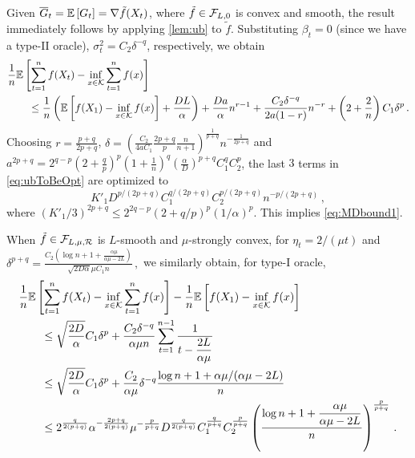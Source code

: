 Given $\overline{G}_t=\mathbb{E}\left[G_t\right] = \nabla \tilde{f}(X_t)$, where $\tilde{f}\in \mathcal{F}_{L,0}$ is convex and smooth,
the result immediately follows by applying \cref{lem:ub} to $\tilde{f}$.
Substituting
 $\beta_t = 0$ (since we have a type-II oracle), $\sigma^2_t = C_2 \delta^{-q}$, respectively, we obtain
 \begin{align}
\MoveEqLeft
\frac{1}{n} \EE{ \sum_{t=1}^n f( X_t) - \inf_{x \in \cK} \sum_{t=1}^n f(x)} \nonumber \\
&\le \frac{1}{n}\left(\EE{f(X_1)-\inf_{x \in \cK}f(x)}+\frac{DL}{\alpha}  \right) %
+\frac{Da}{\alpha} n^{r-1}+\dfrac{C_2 \delta^{-q}}{2a(1-r)}n^{-r}+ \left(2+\dfrac{2}{n}\right)C_1\delta^p \,.
\label{eq:ubToBeOpt}
 \end{align}
 Choosing $r = \frac{p+q}{2p+q}$,  
 $\delta = \left( \tfrac{C_2}{4aC_1}\tfrac{2p+q}{p}\tfrac{n}{n+1}\right)^{\frac{1}{p+q}}n^{-\frac{1}{2p+q}}$  and
 $a^{2p+q} =2^{q-p}\left( 2+\tfrac{q}{p} \right)^p\left(1+ \tfrac{1}{n} \right)^q \left( \tfrac{\alpha}{D} \right)^{p+q}C_1^q C_2^p $,
the last $3$ terms in \eqref{eq:ubToBeOpt} are optimized to
 \[
 K'_1 D^{p/(2p+q)} C_1^{q/(2p+q)} C_2^{p/(2p+q)} n ^{-p/(2p+q)} \,,
 \]
 where
 $(K'_1/3)^{2p+q} \le 2^{2q-p}\left(2+q/p \right)^p \left(1/\alpha\right)^{p}$. This implies \eqref{eq:MDbound1}.
 
When $\tilde{f} \in \mathcal{F}_{L,\mu, \mathcal{R}}$ is $L$-smooth and $\mu$-strongly convex, for
$\eta_t = 2/(\mu t)$ and 
$
\delta^{p+q} =  \tfrac{C_2\left( \log n+1+\tfrac{\alpha \mu}{\alpha \mu -2L}\right)}{\sqrt{2D\alpha} \mu C_1 n} \,,
$
we similarly obtain, for type-I oracle, 
 \begin{align*}
 \MoveEqLeft
\frac{1}{n} \EE{ \sum_{t=1}^n f( X_t) - \inf_{x \in \cK} \sum_{t=1}^n f(x)} -\frac{1}{n}\EE{f(X_1)-\inf_{x \in \cK}f(x)}\\
&\le \sqrt{\dfrac{2D}{\alpha}} C_1\delta^p+\dfrac{C_2 \delta^{-q}}{\alpha \mu n} \sum_{t=1}^{n-1}\dfrac{1}{t-\dfrac{2L}{\alpha \mu}}\\
&\le \sqrt{\dfrac{2D}{\alpha}}C_1\delta^p+\dfrac{C_2 }{\alpha \mu}\delta^{-q} \dfrac{\log n+1+\alpha \mu/(\alpha \mu-2L)}{n}\\
&\le 2^{\frac{q}{2(p+q)}}\alpha^{-\frac{2p+q}{2(p+q)}}\mu^{-\frac{p}{p+q}} D^{\frac{q}{2(p+q)}}C_1^{\frac{q}{p+q}}C_2^{\frac{p}{p+q}} \left( \frac{\log n+1+\dfrac{\alpha \mu}{\alpha \mu -2L}}{n} \right)^{\frac{p}{p+q}}\,.
 \end{align*}

